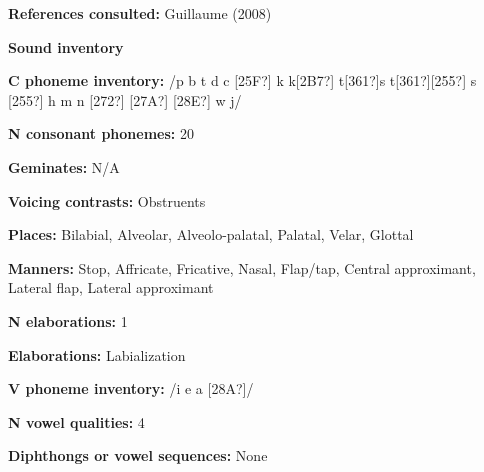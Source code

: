 \begin{styleBody}
\textbf{References consulted: }Guillaume (2008)
\end{styleBody}

\begin{styleBody}
\textbf{Sound inventory}
\end{styleBody}

\begin{styleBody}
\textbf{C phoneme inventory:} /p b t d c [25F?] k k[2B7?] t[361?]s t[361?][255?] s [255?] h m n [272?] [27A?] [28E?] w j/
\end{styleBody}

\begin{styleBody}
\textbf{N consonant phonemes:} 20
\end{styleBody}

\begin{styleBody}
\textbf{Geminates:} N/A
\end{styleBody}

\begin{styleBody}
\textbf{Voicing contrasts: }Obstruents
\end{styleBody}

\begin{styleBody}
\textbf{Places: }Bilabial, Alveolar, Alveolo-palatal, Palatal, Velar, Glottal
\end{styleBody}

\begin{styleBody}
\textbf{Manners:} Stop, Affricate, Fricative, Nasal, Flap/tap, Central approximant, Lateral flap, Lateral approximant
\end{styleBody}

\begin{styleBody}
\textbf{N elaborations:} 1
\end{styleBody}

\begin{styleBody}
\textbf{Elaborations:} Labialization
\end{styleBody}

\begin{styleBody}
\textbf{V phoneme inventory:} /i e a [28A?]/
\end{styleBody}

\begin{styleBody}
\textbf{N vowel qualities:} 4
\end{styleBody}

\begin{styleBody}
\textbf{Diphthongs or vowel sequences:} None
\end{styleBody}

